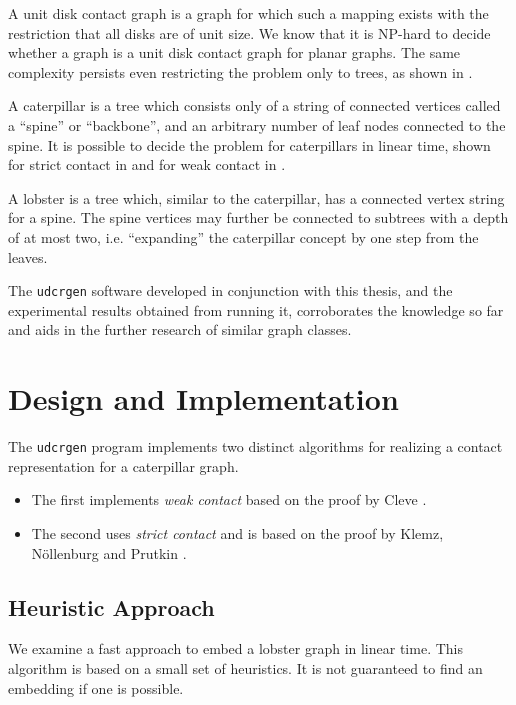 \documentclass[draft,final]{vutinfth} %
\begin{document}
A unit disk contact graph is a graph for which such a mapping exists with the restriction that all disks are of unit size.
We know that it is NP-hard to decide whether a graph is a unit disk contact graph for planar graphs.
The same complexity persists even restricting the problem only to trees, as shown in \cite{Cleve2020}.

A caterpillar is a tree which consists only of a string of connected vertices called a “spine” or “backbone”, and an arbitrary number of leaf nodes connected to the spine.
It is possible to decide the problem for caterpillars in linear time, shown for strict contact in \cite{Klemz2015} and for weak contact in \cite{Cleve2020}.

A lobster is a tree which, similar to the caterpillar, has a connected vertex string for a spine.
The spine vertices may further be connected to subtrees with a depth of at most two, i.e. “expanding” the caterpillar concept by one step from the leaves.

The \texttt{udcrgen} software developed in conjunction with this thesis, and the experimental results obtained from running it, corroborates the knowledge so far and aids in the further research of similar graph classes.

\chapter{Design and Implementation}

The \texttt{udcrgen} program implements two distinct algorithms for realizing a contact representation for a caterpillar graph.

\begin{itemize}
    \item The first implements \emph{weak contact} based on the proof by Cleve \cite{Cleve2020}.
    \item The second uses \emph{strict contact} and is based on the proof by Klemz, Nöllenburg and Prutkin \cite{Klemz2015}.
\end{itemize}

\section{Heuristic Approach}

We examine a fast approach to embed a lobster graph in linear time.
This algorithm is based on a small set of heuristics.
It is not guaranteed to find an embedding if one is possible.
\end{document}
